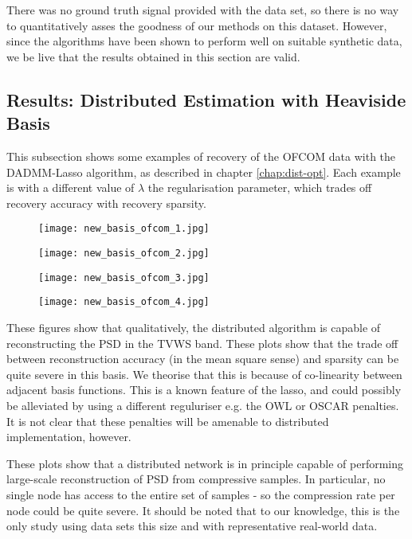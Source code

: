 There was no ground truth signal provided with the data set, so there is no way to quantitatively asses the goodness of our methods on this dataset. However, since the algorithms have been shown to perform well on suitable synthetic data, we be live that the results obtained in this section are valid.

\subsection{Results: Distributed Estimation with Heaviside Basis}

This subsection shows some examples of recovery of the OFCOM data with the DADMM-Lasso algorithm, as described in chapter \ref{chap:dist-opt}. Each example is with a different value of \(\lambda\) the regularisation parameter, which trades off recovery accuracy with recovery sparsity.

\begin{figure}[h]
\centering
\texttt{[image: new\_basis\_ofcom\_1.jpg]}
\caption{}
\label{fig:hvb}
\end{figure}

\begin{figure}[h]
\centering
\texttt{[image: new\_basis\_ofcom\_2.jpg]}
\caption{}
\label{fig:hvb}
\end{figure}

\begin{figure}[h]
\centering
\texttt{[image: new\_basis\_ofcom\_3.jpg]}
\caption{}
\label{fig:hvb}
\end{figure}

\begin{figure}[h]
\centering
\texttt{[image: new\_basis\_ofcom\_4.jpg]}
\caption{}
\label{fig:hvb}
\end{figure}

These figures show that qualitatively, the distributed algorithm is capable of reconstructing the PSD in the TVWS band. These plots show that the trade off between reconstruction accuracy (in the mean square sense) and sparsity can be quite severe in this basis. We theorise that this is because of co-linearity between adjacent basis functions. This is a known feature of the lasso, and could possibly be alleviated by using a different reguluriser e.g. the OWL or OSCAR penalties. It is not clear that these penalties will be amenable to distributed implementation, however.

These plots show that a distributed network is in principle capable of performing large-scale reconstruction of PSD from compressive samples. In particular, no single node has access to the entire set of samples - so the compression rate per node could be quite severe. It should be noted that to our knowledge, this is the only study using data sets this size and with representative real-world data. 

